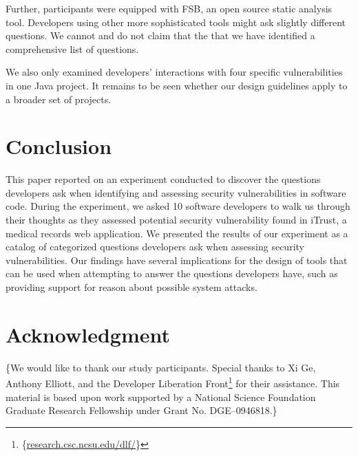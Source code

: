 \documentclass[conference]{IEEEtran}
\newcommand{\blind}[1]{{\color{white}\{#1\}}}
\begin{document}
Further, participants were equipped with FSB, an open source static analysis tool. 
Developers using other more sophisticated tools might ask slightly different questions.
We cannot and do not claim that the that we have identified a comprehensive list of questions.

We also only examined developers' interactions with four specific vulnerabilities in one Java project. 
It remains to be seen whether our design guidelines apply to a broader set of projects.




\section{Conclusion}
\label{sec:concl}
This paper reported on an experiment conducted to discover the questions developers ask when identifying and assessing security vulnerabilities in software code.
During the experiment, we asked 10 software developers to walk us through their thoughts as they assessed potential security vulnerability found in iTrust, a medical records web application.
We presented the results of our experiment as a catalog of categorized questions developers ask when assessing security vulnerabilities.
Our findings have several implications for the design of tools that can be used when attempting to answer the questions developers have, such as providing support for reason about possible system attacks.






\section*{Acknowledgment}

\blind{We would like to thank our study participants. 
Special thanks to Xi Ge, Anthony Elliott, and the Developer Liberation Front\footnote{\blind{\url{research.csc.ncsu.edu/dlf/}}} for their assistance. 
This material is based upon work supported by a National Science Foundation Graduate Research Fellowship under Grant No. DGE--0946818.}
\end{document}
